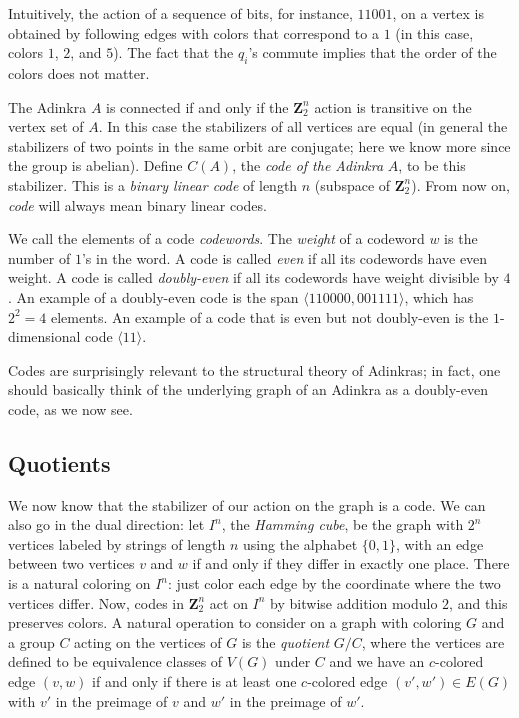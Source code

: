 \documentclass[12pt,twoside,singlespace]{article}
\numberwithin{equation}{section}
\theoremstyle{definition}
\newcommand{\ZZ}{\mathbf{Z}}
\begin{document}
Intuitively, the action of a sequence of bits, for instance, $11001$, on a vertex is obtained by following edges with colors that correspond to a $1$ (in this case, colors $1$, $2$, and $5$).  The fact that the $q_i$'s commute implies that the order of the colors does not matter.

The Adinkra $A$ is connected if and only if the $\ZZ_2^n$ action is transitive on the vertex set of $A$.  In this case the stabilizers of all vertices are equal (in general the stabilizers of two points in the same orbit are conjugate; here we know more since the group is abelian).  Define $C(A)$, the \emph{code of the Adinkra} $A$, to be this stabilizer.  This is a \emph{binary linear code} of length $n$ (subspace of $\ZZ_2^n$). From now on, \emph{code} will always mean binary linear codes.

We call the elements of a code  \emph{codewords}. The \emph{weight} of a codeword $w$ is the number of $1$'s in the word. A code is called \emph{even} if all its codewords have even weight. A code is called \emph{doubly-even} if all its codewords have weight divisible by $4$. An example of a doubly-even code is the span $\langle 110000, 001111\rangle$, which has $2^2 = 4$ elements. An example of a code that is even but not doubly-even is the $1$-dimensional code $\langle 11 \rangle$.

Codes are surprisingly relevant to the structural theory of Adinkras; in fact, one should basically think of the underlying graph of an Adinkra as a doubly-even code, as we now see.

\subsection{Quotients}
We now know that the stabilizer of our action on the graph is a code. We can also go in the dual direction: let $I^n$, the \emph{Hamming cube}, be the graph with $2^n$ vertices labeled by strings of length $n$ using the alphabet $\{0, 1\}$, with an edge between two vertices $v$ and $w$ if and only if they differ in exactly one place. There is a natural coloring on $I^n$: just color each edge by the coordinate where the two vertices differ.  Now, codes in $\ZZ_2^n$ act on $I^n$ by bitwise addition modulo $2$, and this preserves colors.  A natural operation to consider on a graph with coloring $G$ and a group $C$ acting on the vertices of $G$ is the \emph{quotient} $G/C$, where the vertices are defined to be equivalence classes of $V(G)$ under $C$ and we have an $c$-colored edge $(v,w)$ if and only if there is at least one $c$-colored edge $(v',w') \in E(G)$ with $v'$ in the preimage of $v$ and $w'$ in the preimage of $w'$. 
\end{document}
